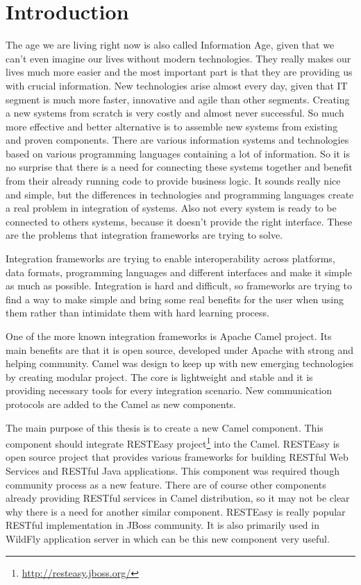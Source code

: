 \documentclass[12pt,final,oneside]{fithesis2}
\begin{document}
\chapter{Introduction}
The age we are living right now is also called Information Age, given that we can't even imagine our lives without modern technologies. They really makes our lives much more easier and the most important part is that they are providing us with crucial information. New technologies arise almost every day, given that IT segment is much more faster, innovative and agile than other segments. Creating a new systems from scratch is very costly and almost never successful. So much more effective and better alternative is to assemble new systems from existing and proven components. There are various information systems and technologies based on various programming languages containing a lot of information. So it is no surprise that there is a need for connecting these systems together and benefit from their already running code to provide business logic. It sounds really nice and simple, but the differences in technologies and programming languages create a real problem in integration of systems. Also not every system is ready to be connected to others systems, because it doesn't provide the right interface. These are the problems that integration frameworks are trying to solve.

Integration frameworks are trying to enable interoperability across platforms, data formats, programming languages and different interfaces and make it simple as much as possible. Integration is hard and difficult, so frameworks are trying to find a way to make simple and bring some real benefits for the user when using them rather than intimidate them with hard learning process.

One of the more known integration frameworks is Apache Camel project\cite{camel-web}. Its main benefits are that it is open source, developed under Apache with strong and helping community. Camel was design to keep up with new emerging technologies by creating modular project. The core is lightweight and stable and it is providing necessary tools for every integration scenario. New communication protocols are added to the Camel as new components.

The main purpose of this thesis is to create a new Camel component. This component should integrate RESTEasy project\footnote{\url{http://resteasy.jboss.org/}} into the Camel. RESTEasy is open source project that provides various frameworks for building RESTful Web Services and RESTful Java applications. This component was required though community process as a new feature. There are of course other components already providing RESTful services in Camel distribution, so it may not be clear why there is a need for another similar component. RESTEasy is really popular RESTful implementation in JBoss community. It is also primarily used in WildFly application server in which can be this new component very useful.
\end{document}
